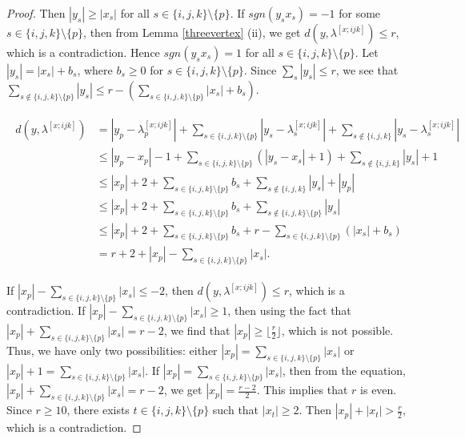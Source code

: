\documentclass{amsart}
\theoremstyle{definition}
\theoremstyle{remark}
\numberwithin{equation}{section}
\newcommand{\f}{\lfloor\frac{r}{2}\rfloor}
\begin{document}
\begin{proof}
	
	Then  $|y_s|\geq |x_s|$  for all $s\in \{i ,j,k\}\setminus \{p\}$. If  $sgn(y_sx_s)=-1$ for some $s \in \{i, j, k\} \setminus \{p\}$, then from Lemma \ref{threevertex} (ii), we get $d(y,\lambda^{[x;ijk]})\leq r$,  which is a contradiction. Hence $sgn(y_sx_s)=1$ for all $s \in \{i, j, k\} \setminus \{p\}$. Let $|y_s|=|x_s|+b_s$, where $b_s\geq 0$ for $s \in \{i, j, k\} \setminus \{p\}$.  Since $\sum_{s}|y_s|\leq r$, we see that $\sum_{s\notin \{i, j,k\} \setminus \{p\}}|y_s|\leq r-(\sum_{s \in \{i, j, k \} \setminus \{p\}}|x_s|+b_s)$.
	
	\begin{align*}
    \begin{split}
		d(y,\lambda^{[x;ijk]})&=|y_p-\lambda^{[x;ijk]}_p|+ \sum_{s \in \{i, j, k\}\setminus\{p\}}|y_s-\lambda^{[x;ijk]}_s|+\sum_{s\notin\{i,j,k\}}|y_s-\lambda^{[x;ijk]}_s| \\
		&\leq  |y_p-x_p|-1+ \sum_{s \in \{i, j, k\}\setminus\{p\}}(|y_s-x_s|+1 )+\sum_{s\notin\{i,j,k\}}|y_s| +1 \\
		&\leq  |x_p|+2+ \sum_{s \in \{i, j, k\}\setminus \{p\}} b_s+\sum_{s\notin\{i,j,k\}}|y_s| +|y_p| \\
		&\leq|x_p|+2+\sum_{s \in \{i, j, k\}\setminus \{p\}} b_s+\sum_{s\notin\{i, j,k\} \setminus \{p\}}|y_s| \\
		&\leq |x_p|+2 + \sum_{s \in \{i, j, k\}\setminus \{p\}} b_s+r- \sum_{s \in \{i, j, k\}\setminus \{p\}} (|x_s|+b_s) \\
		&= r+2+|x_p|-\sum_{s \in \{i, j, k\}\setminus \{p\}} |x_s|.
         	\end{split}
	\end{align*}
	
	If $|x_p|-\sum_{s \in \{i, j, k\}\setminus \{p\}} |x_s|\leq -2$, then $d(y,\lambda^{[x;ijk]})\leq r$, which is a contradiction. If $|x_p|-\sum_{s \in \{i, j, k\}\setminus \{p\}} |x_s|\geq 1$, then using the fact that $|x_p|+\sum_{s \in \{i, j, k\}\setminus \{p\}} |x_s|=r-2$, we find that $|x_p|\geq \f$, which is not possible. Thus, we have only two possibilities: either $|x_p|=\sum_{s \in \{i, j, k\}\setminus \{p\}} |x_s|$ or $|x_p|+1=\sum_{s \in \{i, j, k\}\setminus \{p\}} |x_s|$. If $|x_p|=\sum_{s \in \{i, j, k\}\setminus \{p\}} |x_s|$, then from the equation, $|x_p|+\sum_{s \in \{i, j, k\}\setminus \{p\}} |x_s|=r-2$, we get $|x_p|=\frac{r-2}{2}$. This implies that $r$ is even. Since $r\geq 10$, there exists $t\in \{i,j,k\}\setminus \{p\}$ such that $|x_t|\geq 2$. Then $|x_p|+|x_t|>\frac{r}{2}$, which is a contradiction. 
	

\end{proof}
\end{document}

